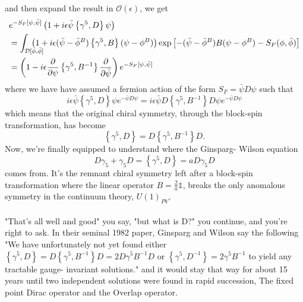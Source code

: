 \documentclass[a4paper,10pt]{book}
\begin{document}
and then expand the result in $\mathcal{O}(\epsilon)$, we get 
\begin{equation}
\begin{aligned} 
&e^{-S_F[\psi, \bar{\psi}]}\left(1+i \epsilon \bar{\psi}\left\{\gamma^{5}, D\right\} \psi\right)\\&=\int_{\mathcal{D}[\phi, \bar{\phi}]} \mkern-30mu\left(1+i \epsilon(\bar{\psi}-\bar{\phi}^B)\left\{\gamma^{5}, B\right\}(\psi-\phi^B)\right) \exp \left[-(\bar{\psi}-\bar{\phi}^B) B(\psi-\phi^B)-S_F(\phi, \bar{\phi})\right]\\
&=\left(1-i \epsilon \frac{\partial}{\partial\psi}\left\{\gamma^{5}, B^{-1}\right\} \frac{\partial}{\partial\bar{\psi}}\right)e^{-S_F[\psi, \bar{\psi}]}
\end{aligned}
\end{equation}
where we have have assumed a fermion action of the form $S_F=\bar{\psi} D \psi$ such that 
\begin{equation}
i \epsilon \bar{\psi}\left\{\gamma^{5}, D\right\} \psi e^{-\bar{\psi} D \psi}=i \epsilon \bar{\psi} D\left\{\gamma^{5}, B^{-1}\right\} D \psi e^{-\bar{\psi}D \psi}
\end{equation}
which means that the original chiral symmetry, through the block-spin transformation, has become 
\begin{equation}
\left\{\gamma^{5}, D\right\} = D\left\{\gamma^{5}, B^{-1}\right\}D.
\end{equation}
Now, we're finally equipped to understand where the Ginsparg- Wilson equation 
\begin{equation*}
D \gamma_{5}+\gamma_{5} D=\left\{\gamma^{5}, D\right\} =a D \gamma_{5} D
\end{equation*}
comes from. It's the remnant chiral symmetry left after a block-spin transformation where the linear operator $B=\frac{2}{a}\mathbb{1}$, breaks the only anomalous symmetry in the continuum theory, $U(1)_{PV}$.\\\\"That's all well and good" you say, "but what is D?" you continue, and you're right to ask. In their seminal 1982 paper\cite{GinspargPaulH1982Aroc}, Ginsparg and Wilson say the following "We have unfortunately not yet found either $\left\{\gamma^{5}, D\right\}=D\left\{\gamma^{5}, B^{-1}\right\} D=2D\gamma^5B^{-1}D$ or $\left\{\gamma^{5}, D^{-1}\right\}=2 \gamma^{5} B^{-1}$ to yield any tractable gauge- invariant solutions." and it would stay that way for about 15 years until two independent solutions were found in rapid succession, The fixed point Dirac operator\cite{HASENFRATZ199853} and the Overlap operator\cite{PhysRevLett.81.4060}.
\end{document}
